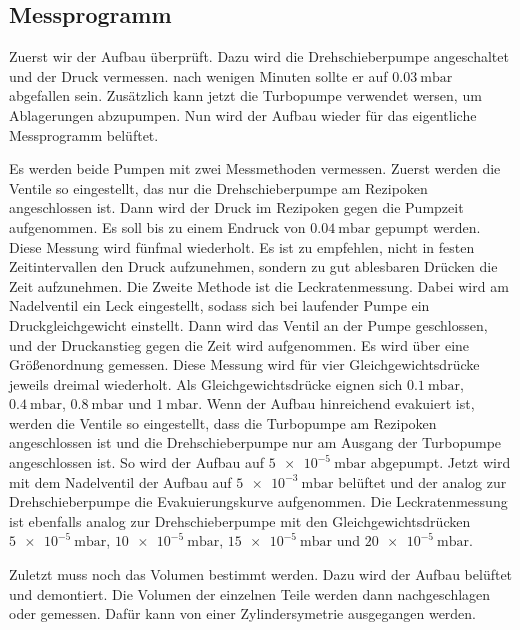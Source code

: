 \subsection{Messprogramm}
Zuerst wir der Aufbau überprüft. Dazu wird die Drehschieberpumpe angeschaltet und der Druck vermessen. nach wenigen Minuten sollte er auf
$\SI{0.03}{\milli \bar}$ abgefallen sein. Zusätzlich kann jetzt die Turbopumpe verwendet wersen, um Ablagerungen abzupumpen. Nun wird der Aufbau wieder für das
eigentliche Messprogramm belüftet.

Es werden beide Pumpen mit zwei Messmethoden vermessen. Zuerst werden die Ventile so eingestellt, das nur die
Drehschieberpumpe am Rezipoken angeschlossen ist. Dann wird der Druck im Rezipoken gegen die Pumpzeit aufgenommen. Es soll bis zu einem Endruck von
$\SI{0.04}{\milli \bar}$ gepumpt werden. Diese Messung wird fünfmal wiederholt. Es ist zu empfehlen, nicht in festen Zeitintervallen den Druck aufzunehmen,
sondern zu gut ablesbaren Drücken die Zeit aufzunehmen.
Die Zweite Methode ist die Leckratenmessung. Dabei wird am Nadelventil ein Leck eingestellt, sodass sich bei laufender Pumpe ein Druckgleichgewicht einstellt.
Dann wird das Ventil an der Pumpe geschlossen, und der Druckanstieg gegen die Zeit wird aufgenommen. Es wird über eine Größenordnung gemessen. Diese Messung
wird für vier Gleichgewichtsdrücke jeweils dreimal wiederholt. Als Gleichgewichtsdrücke eignen sich $\SI{0.1}{\milli \bar}$,
$\SI{0.4}{\milli \bar}$, $\SI{0.8}{\milli \bar}$ und $\SI{1}{\milli \bar}$. Wenn der Aufbau
hinreichend evakuiert ist, werden die Ventile so eingestellt, dass die Turbopumpe am Rezipoken angeschlossen ist und die Drehschieberpumpe nur am Ausgang der
Turbopumpe angeschlossen ist. So wird der Aufbau auf $\SI{5e-5}{\milli \bar}$ abgepumpt. Jetzt wird mit dem Nadelventil der Aufbau auf $\SI{5e-3}{\milli \bar}$
belüftet und der analog zur Drehschieberpumpe die Evakuierungskurve aufgenommen. Die Leckratenmessung ist ebenfalls analog zur Drehschieberpumpe mit den
Gleichgewichtsdrücken $\SI{5e-5}{\milli \bar}$, $\SI{10e-5}{\milli \bar}$, $\SI{15e-5}{\milli \bar}$ und $\SI{20e-5}{\milli \bar}$.

Zuletzt muss noch das Volumen bestimmt werden. Dazu wird der Aufbau belüftet und demontiert. Die Volumen der einzelnen Teile werden dann nachgeschlagen oder
gemessen. Dafür kann von einer Zylindersymetrie ausgegangen werden.
